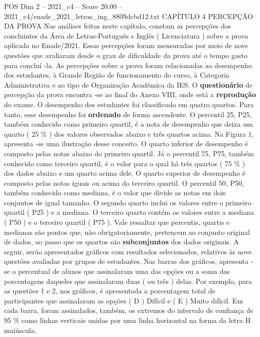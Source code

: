 \begin{textsample}{POS Dim 2 – 2021\_c4 – Score 20.00 – 2021\_c4/enade\_2021\_letras\_ing\_8809dcbd12.txt}  \label{ex:f2_pos_031}
CAPÍTULO 4 PERCEPÇÃO DA PROVA Nas análises feitas neste capítulo, constam as percepções dos concluintes da Área de Letras-Português e Inglês ( Licenciatura ) sobre a prova aplicada no Enade/2021.
Essas percepções foram mensuradas por meio de nove questões que avaliaram desde o grau de dificuldade da prova até o tempo gasto para concluí -la.
As percepções sobre a prova foram relacionadas ao desempenho dos estudantes, à Grande Região de funcionamento do curso, à Categoria Administrativa e ao tipo de Organização Acadêmica da IES.
O \textbf{questionário} de percepção da prova encontra -se ao final do Anexo VIII, onde está a \textbf{reprodução} do exame.
O desempenho dos estudantes foi classificado em quatro quartos.
Para tanto, esse desempenho foi \textbf{ordenado} de forma ascendente.
O percentil 25, P25, também conhecido como primeiro quartil, é a nota de desempenho que deixa um quarto ( 25 \% ) dos valores observados abaixo e três quartos acima.
Na Figura 1, apresenta -se uma ilustração desse conceito.
O quarto inferior de desempenho é composto pelas notas abaixo do primeiro quartil.
Já o percentil 75, P75, também conhecido como terceiro quartil, é o valor para o qual há três quartos ( 75 \% ) dos dados abaixo e um quarto acima dele.
O quarto superior de desempenho é composto pelas notas iguais ou acima do terceiro quartil.
O percentil 50, P50, também conhecido como mediana, é o valor que divide as notas em dois conjuntos de igual tamanho.
O segundo quarto inclui os valores entre o primeiro quartil ( P25 ) e a mediana.
O terceiro quarto contém os valores entre a mediana ( P50 ) e o terceiro quartil ( P75 ).
Vale ressaltar que percentis, quartis e medianas são pontos que, não obrigatoriamente, pertencem ao conjunto original de dados, ao passo que os quartos são \textbf{subconjuntos} dos dados originais.
A seguir, serão apresentados gráficos com resultados selecionados, relativos às nove questões avaliadas por grupos de estudantes.
Nas barras dos gráficos, apresenta -se o percentual de alunos que assinalaram uma das opções ou a soma das porcentagens daqueles que assinalaram duas ( ou três ) delas.
Por exemplo, para as questões 1 e 2, nos gráficos, é apresentada a porcentagem total de participantes que assinalaram as opções ( D ) Difícil e ( E ) Muito difícil.
Em cada barra, foram assinalados, também, os extremos do intervalo de confiança de 95 \% como linhas verticais unidas por uma linha horizontal na forma da letra H maiúscula.

\end{textsample}
